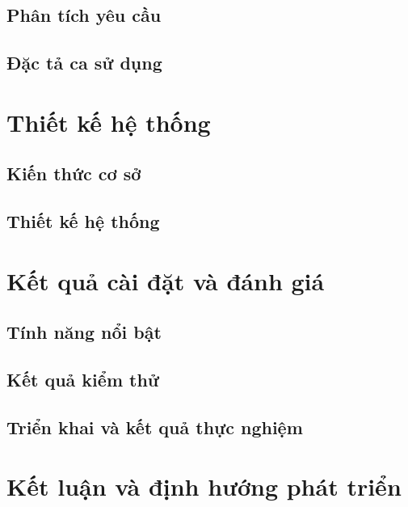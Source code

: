 \documentclass{report}
\begin{document}
\section{Phân tích yêu cầu}


\section{Đặc tả ca sử dụng}


\chapter{Thiết kế hệ thống}

\section{Kiến thức cơ sở}


\section{Thiết kế hệ thống}


% 

\chapter{Kết quả cài đặt và đánh giá}

\section{Tính năng nổi bật}


\section{Kết quả kiểm thử}


\section{Triển khai và kết quả thực nghiệm}


\chapter{Kết luận và định hướng phát triển}


\nocite{*}
\printbibliography[heading=bibintoc, title=Tài liệu tham khảo]



\end{document}
